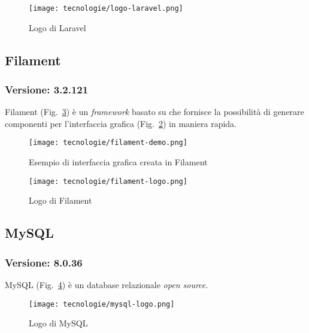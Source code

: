 \begin{figure}[!h] 
  \centering 
  \texttt{[image: tecnologie/logo-laravel.png]} 
  \caption{Logo di Laravel}
  \label{fig:logo-laravel}
\end{figure}

\newpage 

\subsection{\label{tec:Filament}Filament}
\subsubsection{Versione: 3.2.121}
Filament (Fig.~\ref{fig:logo-filament}) è un \emph{\emph{framework}} basato su  che fornisce la possibilità di generare componenti per l'interfaccia grafica (Fig.~\ref{fig:gui-filament}) in maniera rapida.

\begin{figure}[!h] 
  \centering 
  \texttt{[image: tecnologie/filament-demo.png]} 
  \caption{Esempio di interfaccia grafica creata in Filament}
  \label{fig:gui-filament}
\end{figure}

\begin{figure}[!h] 
  \centering 
  \texttt{[image: tecnologie/filament-logo.png]} 
  \caption{Logo di Filament}
  \label{fig:logo-filament}
\end{figure}

\newpage

\subsection{\label{tec:mysql}MySQL}
\subsubsection{Versione: 8.0.36}
MySQL (Fig.~\ref{fig:logo-mysql}) è un database relazionale \emph{open source}.

\begin{figure}[!h] 
  \centering 
  \texttt{[image: tecnologie/mysql-logo.png]} 
  \caption{Logo di MySQL}
  \label{fig:logo-mysql}
\end{figure}


